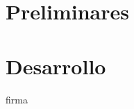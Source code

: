 \documentclass[a4paper,twoside,12pt]{book}
\begin{document}
\pagestyle{empty}
\maketitle             %

\frontmatter
%
%
\tableofcontents
\listoffigures
%
\mainmatter\pfchdr

\part{Preliminares}

%

\part{Desarrollo}
%
%
%
%


\appendix






firma
\end{document}
